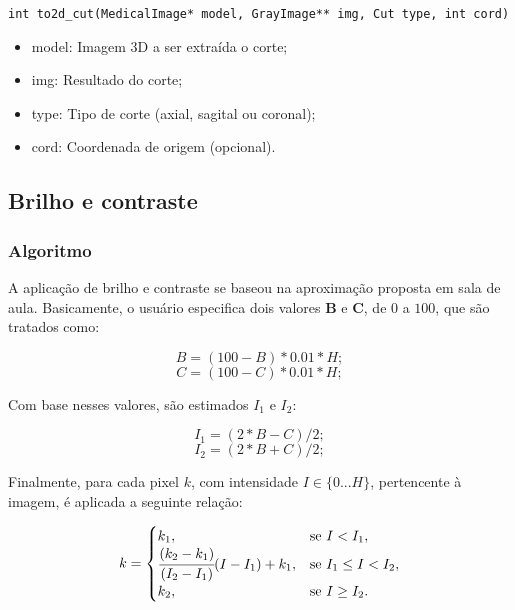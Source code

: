             \texttt{int to2d\_cut(MedicalImage* model, GrayImage** img, Cut type, int cord)}

            \begin{itemize} 
                \item model: Imagem 3D a ser extraída o corte;
                \item img: Resultado do corte;
                \item type: Tipo de corte (axial, sagital ou coronal);
                \item cord: Coordenada de origem (opcional).
            \end{itemize}

    \subsection{Brilho e contraste}
        \subsubsection{Algoritmo}
            A aplicação de brilho e contraste se baseou na aproximação proposta em sala de aula. Basicamente, o usuário especifica dois valores \textbf{B} e \textbf{C}, de $0$ a $100$, que são tratados como:

            \begin{equation}
                B = (100 - B) * 0.01 * H;
            \end{equation}
            \begin{equation}
                C = (100 - C) * 0.01 * H;
            \end{equation}

            Com base nesses valores, são estimados $I_1$ e $I_2$:

            \begin{equation}
                I_1 = (2 * B - C)/2;
            \end{equation}
            \begin{equation}
                I_2 = (2 * B + C)/2;
            \end{equation}

            Finalmente, para cada pixel $k$, com intensidade $I \in \{0 ... H\}$, pertencente à imagem, é aplicada a seguinte relação:

            \[ k =
                \begin{cases}
                    k_1, & \text{se } I < I_1,\\
                    \cfrac{(k_2 - k_1)}{(I_2 - I_1)} (I - I_1) + k_1, & \text{se } I_1 \leq I < I_2,\\
                    k_2, & \text{se } I \geq I_2.
                \end{cases}
            \]

